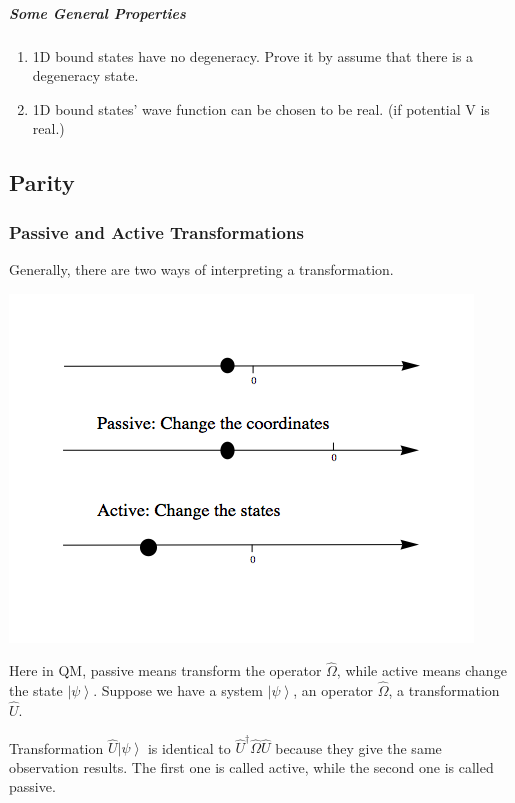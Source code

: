 \documentclass[letterpaper,10pt,english]{sphinxmanual}
\newcommand{\ket}[1]{\left| #1\right\rangle}
\begin{document}
\subparagraph{Some General Properties}
\label{QuantumMechanics:some-general-properties}\begin{enumerate}
\item {} 
1D bound states have no degeneracy.
Prove it by assume that there is a degeneracy state.

\item {} 
1D bound states' wave function can be chosen to be real. (if potential V is real.)

\end{enumerate}


\subsection{Parity}
\label{QuantumMechanics:parity}

\subsubsection{Passive and Active Transformations}
\label{QuantumMechanics:passive-and-active-transformations}
Generally, there are two ways of interpreting a transformation.

\includegraphics{transformations.png}

Here in QM, passive means transform the operator $\hat \Omega$, while active means change the state $\ket{\psi}$. Suppose we have a system $\ket{\psi}$, an operator $\hat \Omega$, a transformation $\hat U$.

Transformation $\hat U \ket{\psi}$ is identical to $\hat U^\dagger \hat \Omega \hat U$ because they give the same observation results. The first one is called active, while the second one is called passive.
\end{document}
